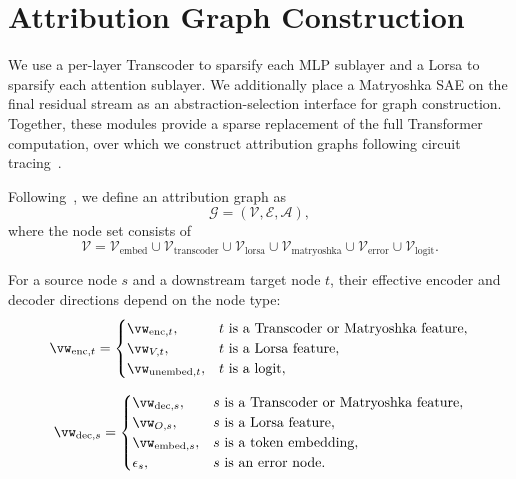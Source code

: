\documentclass{article}
\begin{document}



\section{Attribution Graph Construction}
\label{sec:attribution_graph_construction}

We use a per-layer Transcoder to sparsify each MLP sublayer and a Lorsa to
sparsify each attention sublayer. We additionally place a Matryoshka SAE on the
final residual stream as an abstraction-selection interface for graph
construction. Together, these modules provide a sparse replacement of the full
Transformer computation, over which we construct attribution graphs following
circuit tracing~\citep{ameisen2025circuit, shu2026completereplacement}.

Following~\citet{shu2026completereplacement}, we define an attribution graph as
\begin{equation}
    \mathcal{G}
    =
    (\mathcal{V}, \mathcal{E}, \mathcal{A}),
    \label{eq:attribution_graph}
\end{equation}
where the node set consists of
\begin{equation}
    \mathcal{V}
    =
    \mathcal{V}_{\mathrm{embed}}
    \cup
    \mathcal{V}_{\mathrm{transcoder}}
    \cup
    \mathcal{V}_{\mathrm{lorsa}}
    \cup
    \mathcal{V}_{\mathrm{matryoshka}}
    \cup
    \mathcal{V}_{\mathrm{error}}
    \cup
    \mathcal{V}_{\mathrm{logit}} .
    \label{eq:attribution_graph_nodes}
\end{equation}

For a source node $s$ and a downstream target node $t$, their effective
encoder and decoder directions depend on the node type:
\begin{equation}
\begin{gathered}
\vw_{\mathrm{enc},t}
=
\begin{cases}
    \vw_{\mathrm{enc},t},
        & t \text{ is a Transcoder or Matryoshka feature}, \\
    \vw_{V,t},
        & t \text{ is a Lorsa feature}, \\
    \vw_{\mathrm{unembed},t},
        & t \text{ is a logit},
\end{cases}
\\[6pt]
\vw_{\mathrm{dec},s}
=
\begin{cases}
    \vw_{\mathrm{dec},s},
        & s \text{ is a Transcoder or Matryoshka feature}, \\
    \vw_{O,s},
        & s \text{ is a Lorsa feature}, \\
    \vw_{\mathrm{embed},s},
        & s \text{ is a token embedding}, \\
    \epsilon_s,
        & s \text{ is an error node}.
\end{cases}
\end{gathered}
\label{eq:effective_enc_dec}
\end{equation}
\end{document}
